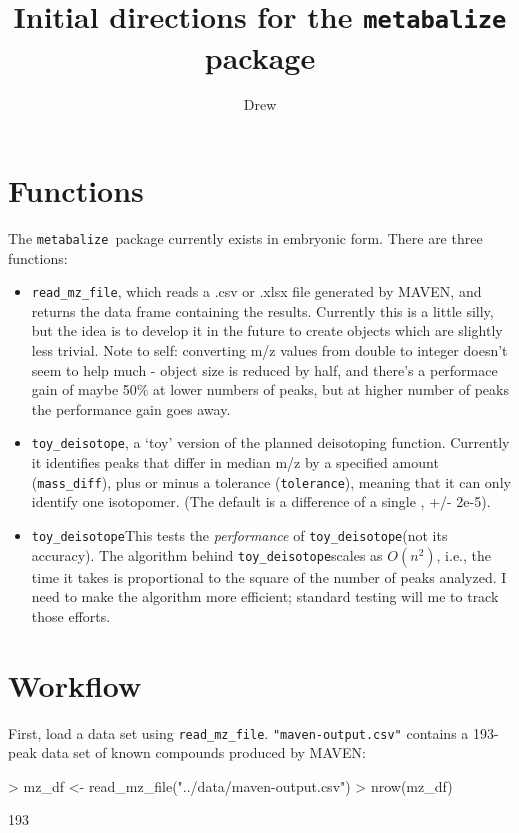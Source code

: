 \documentclass{article}
\title{Initial directions for the \texttt{metabalize} package}
\author{Drew}
\newcommand{\metabalize}{\texttt{metabalize }}
\newcommand{\readmzfile}{\texttt{read\_mz\_file}}
\newcommand{\toydeisotope}{\texttt{toy\_deisotope}}
\newcommand{\testtoydeisotope}{\texttt{toy\_deisotope}}
\begin{document}
\maketitle



\section{Functions}

The \metabalize package currently exists in embryonic form. There are three functions:

\begin{itemize}
  \item \readmzfile, which reads a .csv or .xlsx file generated by MAVEN, and returns the data frame containing the results. Currently this is a little silly, but the idea is to develop it in the future to create objects which are slightly less trivial.
  Note to self: converting m/z values from double to integer doesn't seem to help much - object size is reduced by half, and there's a performace gain of maybe 50\% at lower numbers of peaks, but at higher number of peaks the performance gain goes away. 
  \item \toydeisotope, a `toy' version of the planned deisotoping function. Currently it identifies peaks that differ in median m/z by a specified amount (\texttt{mass\_diff}), plus or minus a tolerance (\texttt{tolerance}), meaning that it can only identify one isotopomer. (The default is a difference of a single , +/- 2e-5).
  \item \testtoydeisotope This tests the \textit{performance} of \toydeisotope (not its accuracy). The algorithm behind \toydeisotope scales as $O(n^2)$, i.e., the time it takes is proportional to the square of the number of peaks analyzed. I need to make the algorithm more efficient; standard testing will me to track those efforts.
\end{itemize}

\section{Workflow}

First, load a data set using \readmzfile. \texttt{"maven-output.csv"} contains a 193-peak data set of known compounds produced by MAVEN:

\begin{Schunk}
\begin{Sinput}
> mz_df <- read_mz_file("../data/maven-output.csv")
> nrow(mz_df)
\end{Sinput}
\begin{Soutput}
[1] 193
\end{Soutput}
\end{Schunk}
\end{document}

